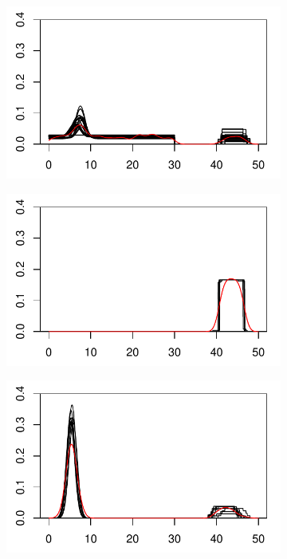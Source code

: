 \begin{figure}[H]
\begin{minipage}{.49\textwidth}
\begin{subfigure}{\linewidth}
\end{subfigure}
\end{minipage}
\begin{minipage}{.49\textwidth}
\begin{subfigure}{\linewidth}
\includegraphics[width=\linewidth]{../simulation/plots/pp_case2_clus1.pdf}
\end{subfigure}
\begin{subfigure}{\linewidth}
\includegraphics[width=\linewidth]{../simulation/plots/pp_case2_clus2.pdf}
\end{subfigure}
\begin{subfigure}{\linewidth}
\includegraphics[width=\linewidth]{../simulation/plots/pp_case2_clus3.pdf}

\end{subfigure}
\end{minipage}
\end{figure}
